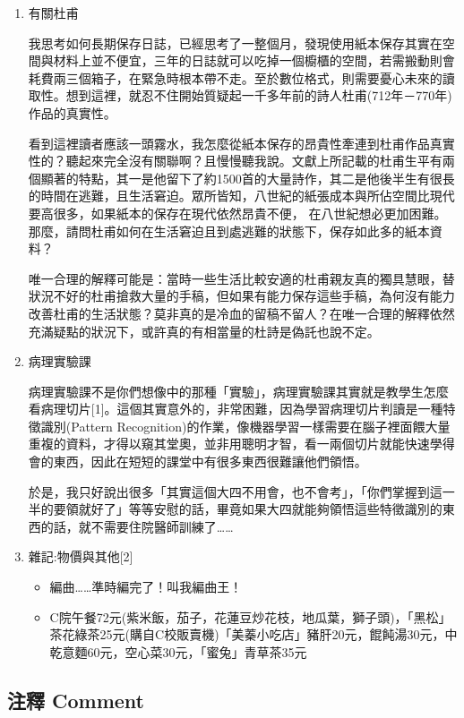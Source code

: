 \documentclass[
]{article}
\providecommand{\tightlist}{%
  \setlength{\itemsep}{0pt}\setlength{\parskip}{0pt}}
\begin{document}
\begin{enumerate}
\def\labelenumi{\arabic{enumi}.}
\item
  有關杜甫

  我思考如何長期保存日誌，已經思考了一整個月，發現使用紙本保存其實在空間與材料上並不便宜，三年的日誌就可以吃掉一個櫥櫃的空間，若需搬動則會耗費兩三個箱子，在緊急時根本帶不走。至於數位格式，則需要憂心未來的讀取性。想到這裡，就忍不住開始質疑起一千多年前的詩人杜甫(712年－770年)作品的真實性。

  看到這裡讀者應該一頭霧水，我怎麼從紙本保存的昂貴性牽連到杜甫作品真實性的？聽起來完全沒有關聯啊？且慢慢聽我說。文獻上所記載的杜甫生平有兩個顯著的特點，其一是他留下了約1500首的大量詩作，其二是他後半生有很長的時間在逃難，且生活窘迫。眾所皆知，八世紀的紙張成本與所佔空間比現代要高很多，如果紙本的保存在現代依然昂貴不便，
  在八世紀想必更加困難。那麼，請問杜甫如何在生活窘迫且到處逃難的狀態下，保存如此多的紙本資料？

  唯一合理的解釋可能是：當時一些生活比較安適的杜甫親友真的獨具慧眼，替狀況不好的杜甫搶救大量的手稿，但如果有能力保存這些手稿，為何沒有能力改善杜甫的生活狀態？莫非真的是冷血的留稿不留人？在唯一合理的解釋依然充滿疑點的狀況下，或許真的有相當量的杜詩是偽託也說不定。
\item
  病理實驗課

  病理實驗課不是你們想像中的那種「實驗」，病理實驗課其實就是教學生怎麼看病理切片{[}1{]}。這個其實意外的，非常困難，因為學習病理切片判讀是一種特徵識別(Pattern
  Recognition)的作業，像機器學習一樣需要在腦子裡面餵大量重複的資料，才得以窺其堂奧，並非用聰明才智，看一兩個切片就能快速學得會的東西，因此在短短的課堂中有很多東西很難讓他們領悟。

  於是，我只好說出很多「其實這個大四不用會，也不會考」，「你們掌握到這一半的要領就好了」等等安慰的話，畢竟如果大四就能夠領悟這些特徵識別的東西的話，就不需要住院醫師訓練了\ldots\ldots{}
\item
  雜記:物價與其他{[}2{]}

  \begin{itemize}
  \tightlist
  \item
    編曲\ldots\ldots 準時編完了！叫我編曲王！
  \item
    C院午餐72元(紫米飯，茄子，花蓮豆炒花枝，地瓜葉，獅子頭)，「黑松」茶花綠茶25元(購自C校販賣機)「美蓁小吃店」豬肝20元，餛飩湯30元，中乾意麵60元，空心菜30元，「蜜兔」青草茶35元
  \end{itemize}
\end{enumerate}

\hypertarget{ux6ce8ux91cb-comment-26}{%
\subsection{注釋 Comment}\label{ux6ce8ux91cb-comment-26}}
\end{document}
